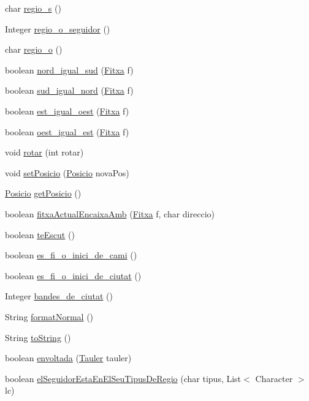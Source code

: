 \begin{DoxyCompactItemize}
char \mbox{\hyperlink{class_fitxa_a787f09b27930fedb010afa53ed5b1a29}{regio\+\_\+s}} ()
\item 
Integer \mbox{\hyperlink{class_fitxa_a9b57519dc7afcbb734a7073353e62dad}{regio\+\_\+o\+\_\+seguidor}} ()
\item 
char \mbox{\hyperlink{class_fitxa_a821a56526407eb83f0d83ae091de0474}{regio\+\_\+o}} ()
\item 
boolean \mbox{\hyperlink{class_fitxa_adf25d9e83a70a03961408b87f01cfdad}{nord\+\_\+igual\+\_\+sud}} (\mbox{\hyperlink{class_fitxa}{Fitxa}} f)
\item 
boolean \mbox{\hyperlink{class_fitxa_abdd6524addc5c6a7ea74363044269cae}{sud\+\_\+igual\+\_\+nord}} (\mbox{\hyperlink{class_fitxa}{Fitxa}} f)
\item 
boolean \mbox{\hyperlink{class_fitxa_a592a69fa34ca3548fc170498b3440927}{est\+\_\+igual\+\_\+oest}} (\mbox{\hyperlink{class_fitxa}{Fitxa}} f)
\item 
boolean \mbox{\hyperlink{class_fitxa_ac5a6f1b4d54afc479b60f24a8e0d6839}{oest\+\_\+igual\+\_\+est}} (\mbox{\hyperlink{class_fitxa}{Fitxa}} f)
\item 
void \mbox{\hyperlink{class_fitxa_adeca1a2543f1ed0dbc74e7cc90169a35}{rotar}} (int rotar)
\item 
void \mbox{\hyperlink{class_fitxa_a63357c2ccc2b283f3b12f4a5aaf50fb0}{set\+Posicio}} (\mbox{\hyperlink{class_posicio}{Posicio}} nova\+Pos)
\item 
\mbox{\hyperlink{class_posicio}{Posicio}} \mbox{\hyperlink{class_fitxa_a9f8c54c9bd9dce77ecd4fd47c58687d3}{get\+Posicio}} ()
\item 
boolean \mbox{\hyperlink{class_fitxa_a7d959d3cdc32495bcf1c2f0f58fe4678}{fitxa\+Actual\+Encaixa\+Amb}} (\mbox{\hyperlink{class_fitxa}{Fitxa}} f, char direccio)
\item 
boolean \mbox{\hyperlink{class_fitxa_a0eacd16882fa0f48bae001b559d3dd13}{te\+Escut}} ()
\item 
boolean \mbox{\hyperlink{class_fitxa_a93e5e168dbfe15afb009c0fbfdc1554a}{es\+\_\+fi\+\_\+o\+\_\+inici\+\_\+de\+\_\+cami}} ()
\item 
boolean \mbox{\hyperlink{class_fitxa_aa8a2753d03291193ef0bb30b5b8839a9}{es\+\_\+fi\+\_\+o\+\_\+inici\+\_\+de\+\_\+ciutat}} ()
\item 
Integer \mbox{\hyperlink{class_fitxa_a8fd756e25d359b4e2b2f4c09138f2219}{bandes\+\_\+de\+\_\+ciutat}} ()
\item 
String \mbox{\hyperlink{class_fitxa_af6e05ee97e95b46e754d73d4e6fd8d8c}{format\+Normal}} ()
\item 
String \mbox{\hyperlink{class_fitxa_aa6b287700281102d846e2522d34074fe}{to\+String}} ()
\item 
boolean \mbox{\hyperlink{class_fitxa_a3470f3a172ff316366ad90579ccb7bef}{envoltada}} (\mbox{\hyperlink{class_tauler}{Tauler}} tauler)
\item 
boolean \mbox{\hyperlink{class_fitxa_a346f5ae28e00995b74b1aba8c630e30d}{el\+Seguidor\+Esta\+En\+El\+Seu\+Tipus\+De\+Regio}} (char tipus, List$<$ Character $>$ lc)
\end{DoxyCompactItemize}
